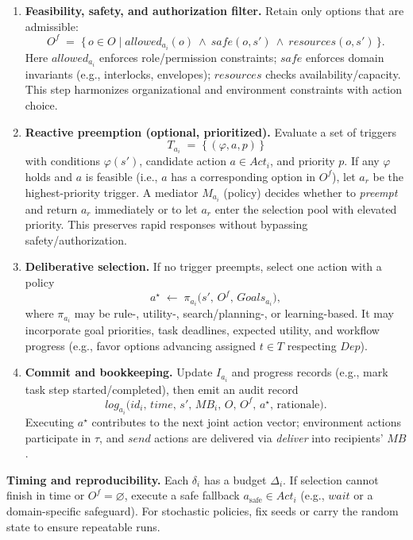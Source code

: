 \begin{enumerate}
  \item \textbf{Feasibility, safety, and authorization filter.} Retain only options that are admissible:
  \[
  O^f \;=\; \{\,o\in O \mid allowed_{a_i}(o)\ \wedge\ safe(o,s')\ \wedge\ resources(o,s')\,\}.
  \]
  Here $allowed_{a_i}$ enforces role/permission constraints; $safe$ enforces domain invariants (e.g., interlocks, envelopes); $resources$ checks availability/capacity. This step harmonizes organizational and environment constraints with action choice.

  \item \textbf{Reactive preemption (optional, prioritized).} Evaluate a set of triggers
  \[
  T_{a_i} \;=\; \{\,(\varphi, a, p)\,\}
  \]
  with conditions $\varphi(s')$, candidate action $a\in Act_i$, and priority $p$. If any $\varphi$ holds and $a$ is feasible (i.e., $a$ has a corresponding option in $O^f$), let $a_r$ be the highest-priority trigger. A mediator $M_{a_i}$ (policy) decides whether to \emph{preempt} and return $a_r$ immediately or to let $a_r$ enter the selection pool with elevated priority. This preserves rapid responses without bypassing safety/authorization.

  \item \textbf{Deliberative selection.} If no trigger preempts, select one action with a policy
  \[
  a^\star \;\leftarrow\; \pi_{a_i}\bigl(s',\, O^f,\, Goals_{a_i}\bigr),
  \]
  where $\pi_{a_i}$ may be rule-, utility-, search/planning-, or learning-based. It may incorporate goal priorities, task deadlines, expected utility, and workflow progress (e.g., favor options advancing assigned $t\in T$ respecting $Dep$).

  \item \textbf{Commit and bookkeeping.} Update $I_{a_i}$ and progress records (e.g., mark task step started/completed), then emit an audit record
  \[
  log_{a_i}\bigl(id_i,\, time,\, s',\, MB_i,\, O,\, O^f,\, a^\star,\, \text{rationale}\bigr).
  \]
  Executing $a^\star$ contributes to the next joint action vector; environment actions participate in $\tau$, and $send$ actions are delivered via \textit{deliver} into recipients’ $MB$.
\end{enumerate}

\noindent\textbf{Timing and reproducibility.} Each $\delta_i$ has a budget $\Delta_i$. If selection cannot finish in time or $O^f=\varnothing$, execute a safe fallback $a_{\text{safe}}\in Act_i$ (e.g., $wait$ or a domain-specific safeguard). For stochastic policies, fix seeds or carry the random state to ensure repeatable runs.

